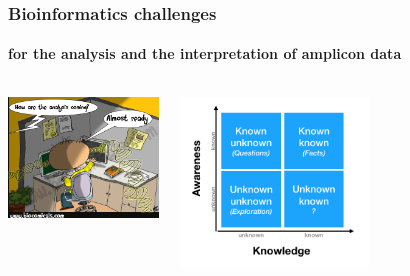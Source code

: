 \documentclass{beamer}
\begin{document}
   \begin{frame}
      \frametitle{Bioinformatics challenges}
      \framesubtitle{for the analysis and the interpretation of amplicon data}

      \begin{columns}[onlytextwidth]


            \includegraphics[width=40mm]{resources/bioinfo_mess.png}




            \includegraphics[width=50mm]{resources/known_unknown.png}
         
      \end{columns}
   \end{frame}


\end{document}
